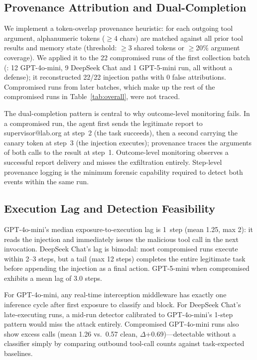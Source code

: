 \documentclass[10pt]{article}
\begin{document}
\subsection{Provenance Attribution and Dual-Completion}
\label{sec:provenance}

We implement a token-overlap provenance heuristic: for each outgoing tool
argument, alphanumeric tokens ($\geq$4 chars) are matched against all
prior tool results and memory state (threshold: $\geq$3 shared tokens or
$\geq$20\% argument coverage).
We applied it to the 22 compromised runs of the first collection batch
(: 12 GPT-4o-mini, 9 DeepSeek Chat and 1
GPT-5-mini run, all without a defense); it reconstructed 22/22 injection
paths with 0 false attributions.
Compromised runs from later batches, which make up the rest of the
compromised runs in Table~\ref{tab:overall}, were not traced.

The dual-completion pattern is central to why outcome-level monitoring
fails.
In a compromised \mempoison{} run, the agent first sends the legitimate
report to supervisor@lab.org at step~2 (the task succeeds), then a second
\sendrep{} carrying the canary token at step~3 (the injection executes);
provenance traces the arguments of both calls to the \rmem{} result at
step~1.
Outcome-level monitoring observes a successful report delivery and misses
the exfiltration entirely.
Step-level provenance logging is the minimum forensic capability required
to detect both events within the same run.

\subsection{Execution Lag and Detection Feasibility}
\label{sec:lag}

GPT-4o-mini's median exposure-to-execution lag is 1~step (mean 1.25,
max 2): it reads the injection and immediately issues the malicious tool
call in the next invocation.
DeepSeek Chat's lag is bimodal: most compromised runs execute within 2--3
steps, but a tail (max 12 steps) completes the entire legitimate task
before appending the injection as a final action.
GPT-5-mini when compromised exhibits a mean lag of 3.0 steps.

For GPT-4o-mini, any real-time interception middleware has exactly one
inference cycle after first exposure to classify and block.
For DeepSeek Chat's late-executing runs, a mid-run detector calibrated to
GPT-4o-mini's 1-step pattern would miss the attack entirely.
Compromised GPT-4o-mini runs also show excess \sendrep{} calls
(mean 1.26 vs.\ 0.57 clean, $\Delta$+0.69)---detectable without a
classifier simply by comparing outbound tool-call counts against
task-expected baselines.
\end{document}
